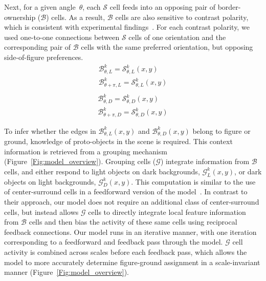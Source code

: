 Next, for a given angle~$\theta$, each $\mathcal{S}$ cell feeds into an opposing pair of border-ownership ($\mathcal{B}$) cells. As a result, $\mathcal{B}$ cells are also sensitive to contrast polarity, which is consistent with experimental findings~\citep{Zhou_etal00}.
For each contrast polarity, we used one-to-one connections between $\mathcal{S}$ cells of one orientation and the corresponding pair of
$\mathcal{B}$ cells with the same preferred orientation, but opposing side-of-figure preferences.
\begin{equation}
\begin{split}
\mathcal{B}^k_{\theta,L} = \mathcal{S}^k_{\theta,L}(x,y)\\
\mathcal{B}^k_{\theta+\pi,L} = \mathcal{S}^k_{\theta,L}(x,y)\\
\end{split}
\end{equation}
\begin{equation}
\begin{split}
\mathcal{B}^k_{\theta,D} = \mathcal{S}^k_{\theta,D}(x,y)\\
\mathcal{B}^k_{\theta+\pi,D} = \mathcal{S}^k_{\theta,D}(x,y)
\end{split}
\end{equation}

To infer whether the edges in $\mathcal{B}^k_{\theta,L}(x,y)$ and $\mathcal{B}^k_{\theta,D}(x,y)$ belong to figure or ground, knowledge of proto-objects in the scene is required. This context information is retrieved from a grouping mechanism (Figure~\ref{Fig:model_overview}). Grouping cells ($\mathcal{G}$) integrate information from $\mathcal{B}$
cells, and either respond to light objects on dark backgrounds, $\mathcal{G}^k_{L}(x,y)$, or dark objects on light backgrounds, $\mathcal{G}^k_{D}(x,y)$. This computation is similar to the use of center-surround cells in a feedforward version of the model~\citep{Russell_etal14}. In contrast to their approach, our model does not require an additional class of center-surround cells, but instead allows $\mathcal{G}$ cells to directly integrate local feature information from $\mathcal{B}$ cells and then bias the activity of these same cells using reciprocal feedback connections. Our model runs in an iterative manner, with one iteration corresponding to a feedforward and feedback pass through the model. $\mathcal{G}$ cell activity is combined across scales before each feedback pass, which allows the model to more accurately determine figure-ground assignment in a scale-invariant manner (Figure~\ref{Fig:model_overview}).

